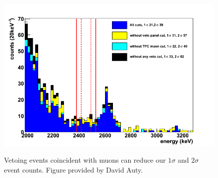 \begin{figure}
\begin{center}
\includegraphics[keepaspectratio=true,width=\textwidth]{SS_Spectrum_noVetoCuts.png}
\end{center}
\renewcommand{\baselinestretch}{1}
\small\normalsize
\begin{quote}
\caption{Vetoing events coincident with muons can reduce our $1\sigma$ and $2\sigma$ event counts.  Figure provided by David Auty.}
\label{fig:Spectrum_noVetoCuts}
\end{quote}
\end{figure}
\renewcommand{\baselinestretch}{2}
\small\normalsize

